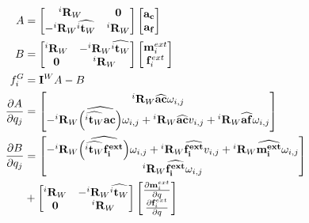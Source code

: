 \begin{align}
  A &=
  \begin{bmatrix}
    {{}^i\mathbf{R}_W} & \mathbf{0} \\
    -{{}^i\mathbf{R}_W}\widehat{{}^i\mathbf{t}_W} & {{}^i\mathbf{R}_W} \\
  \end{bmatrix}
  \begin{bmatrix}
    \mathbf{a_c} \\ \mathbf{a_f}
  \end{bmatrix} \\
  B &=
  \begin{bmatrix}
    {{}^i\mathbf{R}_W} & -{{}^i\mathbf{R}_W}\widehat{{}^i\mathbf{t}_W} \\
    \mathbf{0} & {{}^i\mathbf{R}_W} \\
  \end{bmatrix}
  \begin{bmatrix}
    \mathbf{m}^{ext}_i \\ \mathbf{f}^{ext}_i
  \end{bmatrix} \\
  f^G_i &= \mathbf{I}^W A-B\\
  \frac{\partial A}{\partial q_j} &=
  \begin{bmatrix}
    {}^i\mathbf{R}_W \widehat{\bf ac} \omega_{i,j}\\
    -{{}^i\mathbf{R}_W}\widehat{\left(\widehat{{}^i\mathbf{t}_W}{\bf ac} \right)}\omega_{i,j}
    + {{}^i\mathbf{R}_W}\widehat{\bf ac} v_{i,j} + {}^i\mathbf{R}_W \widehat{\bf af} \omega_{i,j}\\
  \end{bmatrix}
  \\
  \frac{\partial B}{\partial q_j} &=
  \begin{bmatrix}
    - {{}^i\mathbf{R}_W}\widehat{\left(\widehat{{}^i\mathbf{t}_W}\bf \mathbf{f}^{ext}_i \right)}\omega_{i,j}
    + {{}^i\mathbf{R}_W}\widehat{\bf \mathbf{f}^{ext}_i} v_{i,j} + {}^i\mathbf{R}_W \widehat{\bf \mathbf{m}^{ext}_i} \omega_{i,j}\\
    {}^i\mathbf{R}_W \widehat{\bf \mathbf{f}^{ext}_i} \omega_{i,j}\\
  \end{bmatrix}
  \\&+
  \begin{bmatrix}
    {{}^i\mathbf{R}_W} & -{{}^i\mathbf{R}_W}\widehat{{}^i\mathbf{t}_W} \\
    \mathbf{0} & {{}^i\mathbf{R}_W} \\
  \end{bmatrix}
  \begin{bmatrix}
    \frac{\partial \mathbf{m}^{ext}_i}{\partial q} \\ \frac{\partial \mathbf{f}^{ext}_i}{\partial q}
  \end{bmatrix}
\end{align}

